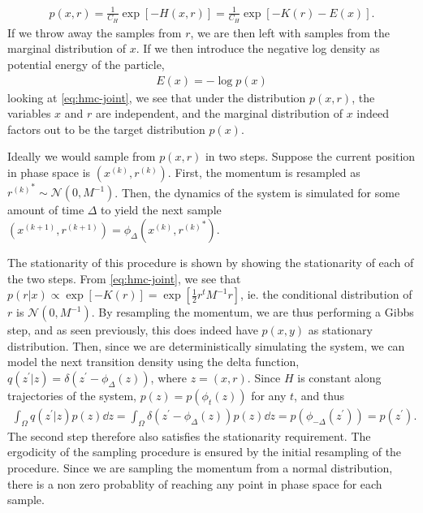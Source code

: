 \begin{align} \label{eq:hmc-joint}
    p(x, r) = \frac{1}{C_H} \exp\left[ -H(x, r)\right] = \frac{1}{C_H} \exp\left[-K(r) - E(x)  \right].
\end{align}
If we throw away the samples from $r$, we are then left with samples from the marginal distribution of $x$. If we then introduce the negative log density as potential energy of the particle,
\begin{align*}
    E(x) = -\log{p(x)}
\end{align*}
looking at \cref{eq:hmc-joint}, we see that under the distribution $p(x, r)$, the variables $x$ and $r$ are independent, and the marginal distribution of $x$ indeed factors out to be the target distribution $p(x)$. 

\newcommand{\newx}{x^{\prime}}
\newcommand{\newr}{{r^{\prime}}}
\newcommand{\oldx}{{x^{(k)}}}
\newcommand{\oldr}{{r^{(k)}}}
\newcommand{\nextx}{x^{(k+1)}}
\newcommand{\nextr}{{r^{(k+1)}}}

Ideally we would sample from $p(x, r)$ in two steps. Suppose the current position in phase space is $(\oldx, \oldr)$. 
First, the momentum is resampled as $\oldr^\ast\sim \mathcal{N}(0, M^{-1})$. Then, the dynamics of the system is simulated for some amount of time $\Delta$ to yield the next sample $(\nextx, \nextr) =\phi_\Delta(\oldx, \oldr^\ast)$.

The stationarity of this procedure is shown by showing the stationarity of each of the two steps. From \cref{eq:hmc-joint}, we see that $p(r|x) \propto \exp[-K(r)] = \exp[\frac{1}{2}r^tM^{-1}r]$, ie. the conditional distribution of $r$ is $\mathcal{N}(0, M^{-1})$.
By resampling the momentum, we are thus performing a Gibbs step, and as seen previously, this does indeed have $p(x, y)$ as stationary distribution.
Then, since we are deterministically simulating the system, we can model the next transition density using the delta function, $q(z^\prime|z) = \delta(z^\prime - \phi_\Delta(z))$, where $z=(x, r)$. 
Since $H$ is constant along trajectories of the system, $p(z) =p(\phi_t(z))$ for any $t$, and thus
\begin{align} \label{eq:}
    \int_{\Omega} q(z^\prime| z ) p(z) \dd{z} = \int_{\Omega} \delta(z^\prime - \phi_\Delta(z))p(z) \dd{z} 
    = p(\phi_{-\Delta}(z^\prime)) = p(z^\prime).
\end{align}
The second step therefore also satisfies the stationarity requirement. The ergodicity of the sampling procedure is ensured by the initial resampling of the procedure. Since we are sampling the momentum from a normal distribution, there is a non zero probablity of reaching any point in phase space for each sample.

